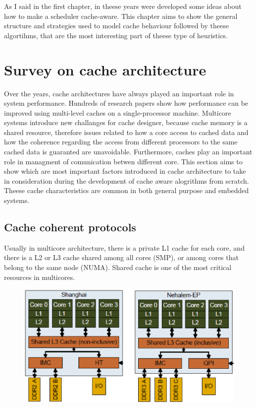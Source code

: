 As I said in the first chapter, in theese years were developed some ideas about how to make a scheduler cache-aware.
This chapter aims to show the general structure and strategies used to model cache behaviour followed by theese algortihms, that are the most interesting 
part of theese type of heuristics.

\section{Survey on cache architecture}
\label{sec:s1}

Over the years, cache architectures have always played an important role in system performance. Hundreds of research papers show how performance
can be improved using multi-level caches on a single-processor machine. Multicore systems introduce new challanges for cache designer, because cache memory 
is a shared resource, therefore issues related to how a core access to cached data and how the coherence regarding the access from different processors 
to the same cached data is guaranted are unavoidable. Furthermore, caches play an important role in managment of comunication betwen different core.
This section aims to show which are most important factors introduced in cache architecture to take in consideration during the development of cache aware
alogrithms from scratch. Theese cache characteristics are common in both general purpose and embedded systems.

\subsection{Cache coherent protocols}

Usually in multicore architecture, there is a private L1 cache for each core, and there is a L2 or L3 cache shared among all cores (SMP), or among cores 
that belong to the same node (NUMA). Shared cache is one of the most critical resources in multicores.

\begin{figure}[htbp]
\centering
\includegraphics[width=\widefigure]{images/neh_amd.eps}
\caption{}
\label{fig:neh_amd}
\end{figure}

